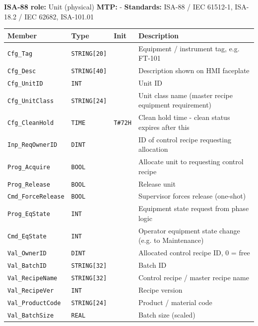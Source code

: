 {\small\textbf{ISA-88 role:} Unit (physical) \quad \textbf{MTP:} - \quad \textbf{Standards:} ISA-88 /\allowbreak{} IEC 61512-1, ISA-18.2 /\allowbreak{} IEC 62682, ISA-101.01}
{\footnotesize
\begin{longtable}{@{}>{\raggedright\arraybackslash}p{3.4cm}>{\raggedright\arraybackslash}p{3.3cm}>{\raggedright\arraybackslash}p{1.3cm}>{\raggedright\arraybackslash}p{6.4cm}@{}}
\toprule
\rowcolor{tblhead}\textbf{Member} & \textbf{Type} & \textbf{Init} & \textbf{Description} \\
\midrule
\endhead
\texttt{Cfg\_Tag} & \texttt{STRING[20]} &  & Equipment /\allowbreak{} instrument tag, e.g. FT-101 \\
\texttt{Cfg\_Desc} & \texttt{STRING[40]} &  & Description shown on HMI faceplate \\
\texttt{Cfg\_UnitID} & \texttt{INT} &  & Unit ID \\
\texttt{Cfg\_UnitClass} & \texttt{STRING[24]} &  & Unit class name (master recipe equipment requirement) \\
\texttt{Cfg\_CleanHold} & \texttt{TIME} & \texttt{T\#72H} & Clean hold time - clean status expires after this \\
\texttt{Inp\_ReqOwnerID} & \texttt{DINT} &  & ID of control recipe requesting allocation \\
\texttt{Prog\_Acquire} & \texttt{BOOL} &  & Allocate unit to requesting control recipe \\
\texttt{Prog\_Release} & \texttt{BOOL} &  & Release unit \\
\texttt{Cmd\_ForceRelease} & \texttt{BOOL} &  & Supervisor forces release (one-shot) \\
\texttt{Prog\_EqState} & \texttt{INT} &  & Equipment state request from phase logic \\
\texttt{Cmd\_EqState} & \texttt{INT} &  & Operator equipment state change (e.g. to Maintenance) \\
\texttt{Val\_OwnerID} & \texttt{DINT} &  & Allocated control recipe ID, 0 = free \\
\texttt{Val\_BatchID} & \texttt{STRING[32]} &  & Batch ID \\
\texttt{Val\_RecipeName} & \texttt{STRING[32]} &  & Control recipe /\allowbreak{} master recipe name \\
\texttt{Val\_RecipeVer} & \texttt{INT} &  & Recipe version \\
\texttt{Val\_ProductCode} & \texttt{STRING[24]} &  & Product /\allowbreak{} material code \\
\texttt{Val\_BatchSize} & \texttt{REAL} &  & Batch size (scaled) \\

\end{longtable}}

